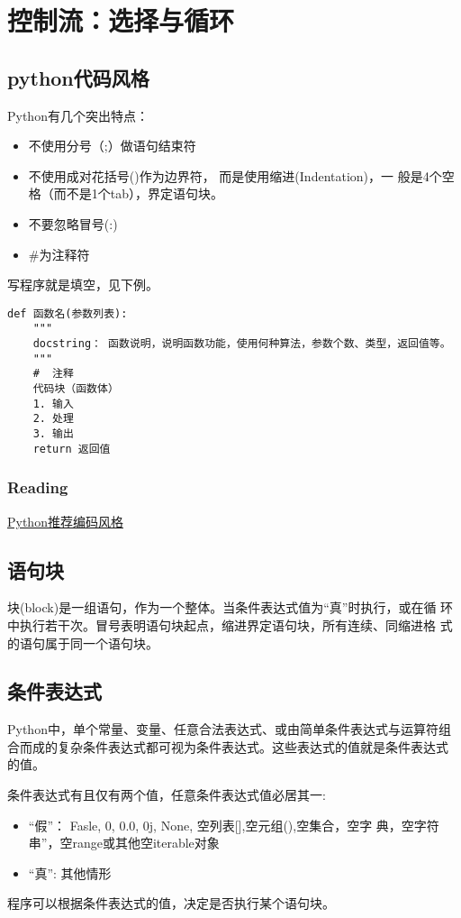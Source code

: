 \chapter{控制流：选择与循环}
\section{python代码风格}
Python有几个突出特点：
\begin{itemize}
  \item 不使用分号（;）做语句结束符
  \item 不使用成对花括号({})作为边界符， 而是使用缩进(Indentation)，一
    般是4个空格（而不是1个tab），界定语句块。
  \item 不要忽略冒号(:)
  \item \#为注释符
\end{itemize}
写程序就是填空，见下例。
\begin{verbatim}
def 函数名(参数列表):
    """
    docstring： 函数说明，说明函数功能，使用何种算法，参数个数、类型，返回值等。
    """
    #  注释
    代码块（函数体）
    1. 输入
    2. 处理
    3. 输出
    return 返回值
\end{verbatim}
\subsection{Reading}
\href{https://www.python.org/dev/peps/pep-0008/}{Python推荐编码风格}
\section{语句块}
块(block)是一组语句，作为一个整体。当条件表达式值为“真”时执行，或在循
环中执行若干次。冒号表明语句块起点，缩进界定语句块，所有连续、同缩进格
式的语句属于同一个语句块。
\section{条件表达式}
Python中，单个常量、变量、任意合法表达式、或由简单条件表达式与运算符组
合而成的复杂条件表达式都可视为条件表达式。这些表达式的值就是条件表达式
的值。

条件表达式有且仅有两个值，任意条件表达式值必居其一:
\begin{itemize}
\item ``假''： Fasle, 0, 0.0, 0j, None, 空列表[],空元组(),空集合，空字
  典{}，空字符串''，空range或其他空iterable对象
\item ``真'': 其他情形
\end{itemize}
程序可以根据条件表达式的值，决定是否执行某个语句块。
